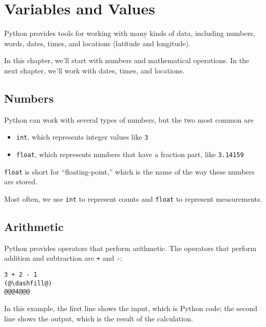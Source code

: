 \hypertarget{variables-and-values}{%
\chapter{Variables and Values}\label{variables-and-values}}

Python provides tools for working with many kinds of data, including
numbers, words, dates, times, and locations (latitude and longitude).

In this chapter, we'll start with numbers and mathematical operations.
In the next chapter, we'll work with dates, times, and locations.

\hypertarget{numbers}{%
\section{Numbers}\label{numbers}}

Python can work with several types of numbers,
but the two most common are

\begin{itemize}
\item
  \passthrough{\lstinline!int!}, which represents integer values like
  \passthrough{\lstinline!3!}
\item
  \passthrough{\lstinline!float!}, which represents numbers that have a
  fraction part, like \passthrough{\lstinline!3.14159!}
\end{itemize}
\passthrough{\lstinline!float!} is short for ``floating-point,'' which
is the name of the way these numbers are stored.

Most often, we use \passthrough{\lstinline!int!} to represent counts and
\passthrough{\lstinline!float!} to represent measurements.

\hypertarget{arithmetic}{%
\section{Arithmetic}\label{arithmetic}}

Python provides operators that perform arithmetic. The operators that
perform addition and subtraction are \passthrough{\lstinline!+!} and
\passthrough{\lstinline!-!}:

\begin{lstlisting}[]
3 + 2 - 1
(@\dashfill@)
@@@4@@@
\end{lstlisting}
In this example, the first line shows the input, which is Python code; the second line shows the output, which is the result of the calculation.

